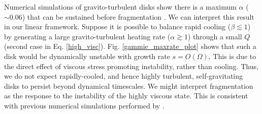 Numerical simulations of gravito-turbulent disks show there is a
maximum $\alpha$ ($\sim 0.06$) that can be sustained before
fragmentation \citep{rice05}. We can interpret this result in our
linear framework. 
Suppose it is possible to balance rapid cooling ($\beta\lesssim1$) 
by generating a large gravito-turbulent heating rate
($\alpha\gtrsim 1$) through a small $Q$ (second case in
Eq. \ref{high_visc}). Fig. \ref{gammie_maxrate_plot}  
shows that such a disk would be dynamically unstable with 
growth rate $s = O(\Omega)$. This is due to the direct effect of viscous 
stress promoting instability, rather than cooling. Thus, we do not expect rapidly-cooled, 
and hence highly turbulent, self-gravitating disks to persist beyond
dynamical timescales.
We might interpret fragmentation as the response to the instability of the
highly viscous state. This is consistent with previous numerical
simulations performed by \cite{lodato05}. 
